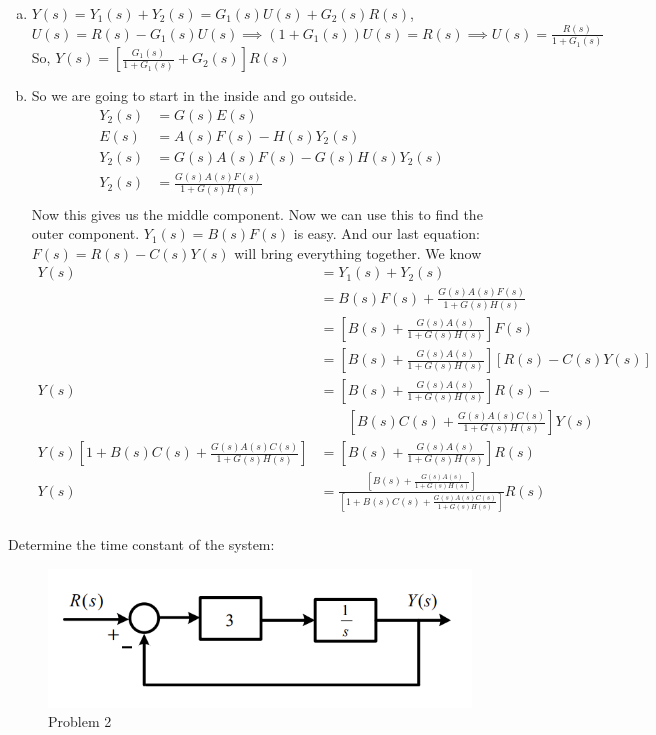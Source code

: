 \documentclass[11pt]{article}
\begin{document}
\begin{enumerate}[a)]
    \item $Y(s) = Y_1(s) + Y_2(s) = G_1(s) U(s) + G_2(s)R(s)$,\\
    $U(s) = R(s) - G_1(s)U(s) \implies (1 + G_1(s))U(s) = R(s) \implies U(s) = \frac{R(s)}{1 + G_1(s)}$ \\
    So, $Y(s) = \left[\frac{G_1(s)}{1 + G_1(s)} + G_2(s)\right] R(s)$
    \item So we are going to start in the inside and go outside.
    \begin{align*}
        Y_2(s) &= G(s)E(s) \\
        E(s) &= A(s)F(s) - H(s)Y_2(s)\\
        Y_2(s) &= G(s)A(s)F(s) - G(s)H(s)Y_2(s)\\
        Y_2(s) &= \frac{G(s)A(s)F(s)}{1 + G(s)H(s)}\\
    \end{align*}
    Now this gives us the middle component. Now we can use this to find the outer component.
    $Y_1(s) = B(s)F(s)$ is easy. And our last equation: $F(s) = R(s) - C(s) Y(s)$ will bring everything together.
    We know \begin{align*}
        Y(s) &= Y_1(s) + Y_2(s) \\ 
        &= B(s)F(s) + \frac{G(s)A(s)F(s)}{1 + G(s)H(s)} \\ 
        &= \left[B(s) + \frac{G(s)A(s)}{1 + G(s)H(s)} \right] F(s) \\
        &= \left[B(s) + \frac{G(s)A(s)}{1 + G(s)H(s)} \right] \left[R(s) - C(s) Y(s) \right] \\
        Y(s) &= \left[B(s) + \frac{G(s)A(s)}{1 + G(s)H(s)} \right] R(s) - \\
        & \quad\quad \left[B(s)C(s) + \frac{G(s)A(s)C(s)}{1 + G(s)H(s)} \right]  Y(s)\\
        Y(s) \left[1 + B(s) C(s) + \frac{G(s)A(s)C(s)}{1 + G(s)H(s)} \right] &= \left[B(s) + \frac{G(s)A(s)}{1 + G(s)H(s)} \right] R(s) \\
        Y(s) &= \frac{\left[B(s) + \frac{G(s)A(s)}{1 + G(s)H(s)} \right]}{\left[1 + B(s) C(s) + \frac{G(s)A(s)C(s)}{1 + G(s)H(s)} \right]} R(s) \\
    \end{align*}
\end{enumerate}



Determine the time constant of the system:
\begin{figure}[h] 
    \centering
    \includegraphics[width=0.55 \linewidth]{prob2}
    \caption{Problem 2}
    \label{fig:p2}
\end{figure}
\end{document}

